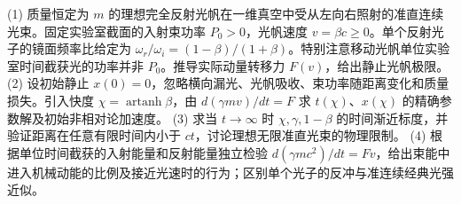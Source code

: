 (1) 质量恒定为 \(m\) 的理想完全反射光帆在一维真空中受从左向右照射的准直连续光束。固定实验室截面的入射束功率 \(P_0>0\)，光帆速度 \(v=\beta c\ge0\)。单个反射光子的镜面频率比给定为 \(\omega_r/\omega_i=(1-\beta)/(1+\beta)\)。特别注意移动光帆单位实验室时间截获光的功率并非 \(P_0\)。推导实际动量转移力 \(F(v)\)，给出静止光帆极限。
(2) 设初始静止 \(x(0)=0\)，忽略横向漏光、光帆吸收、束功率随距离变化和质量损失。引入快度 \(\chi=\operatorname{artanh}\beta\)，由 \(d(\gamma mv)/dt=F\) 求 \(t(\chi)\)、\(x(\chi)\) 的精确参数解及初始非相对论加速度。
(3) 求当 \(t\to\infty\) 时 \(\chi,\gamma,1-\beta\) 的时间渐近标度，并验证距离在任意有限时间内小于 \(ct\)，讨论理想无限准直光束的物理限制。
(4) 根据单位时间截获的入射能量和反射能量独立检验 \(d(\gamma mc^2)/dt=Fv\)，给出束能中进入机械动能的比例及接近光速时的行为；区别单个光子的反冲与准连续经典光强近似。
